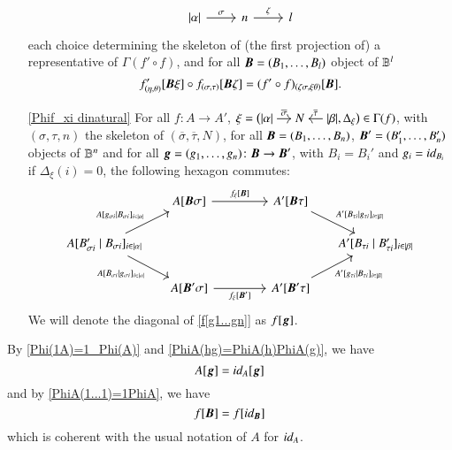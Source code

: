 \begin{definition}
\begin{itemize}[wide=0pt,leftmargin=*]
\[\begin{tikzcd}
        \length\alpha \ar[r,"\sigma"] & n \ar[r,"\zeta"] & l
        \end{tikzcd}
        \]
        each choice determining the skeleton of (the first projection of) a representative of $\Gamma(f' \circ f)$, and for all ${\boldsymbol B}=(B_1,\dots,B_l)$ object of $\mathbb B^l$
        \[
        f'_{(\eta,\theta)}[{\boldsymbol B}\xi] \circ f_{(\sigma,\tau)}[{\boldsymbol B}\zeta] = (f'\circ f)_{(\zeta\sigma,\xi\theta)}[{\boldsymbol B}].
        \] 
        \item[\ref{Phif_xi dinatural}] For all $f \colon A \to A'$, $\xi= \bigl(
        \begin{tikzcd}[cramped,sep=small]
        \length\alpha \ar[r,"\overline\sigma"] & N & \length\beta \ar[l,"\overline\tau"']
        \end{tikzcd}, \Delta_\xi \bigr) \in \Gamma(f)
        $,
        with
        $(\sigma,\tau,n)$ the skeleton of $(\overline\sigma,\overline\tau,N)$, for all ${\boldsymbol B}=(B_1,\dots,B_n)$, ${\boldsymbol B}'=(B_1',\dots,B_n')$ objects of $\mathbb B^n$ and for all ${\boldsymbol g}=(g_1,\dots,g_n) \colon {\boldsymbol B} \to {\boldsymbol B}'$, with $B_i=B_i'$ and  $g_i=\mathop{\textit{id}_{B_i}}$ if $\Delta_\xi(i)=0$, the following hexagon commutes:
        \begin{equation}\label{f[g1...gn]}
        \begin{tikzcd}[column sep={0.5cm}]
        & A[\bfB\sigma] \ar[rrr,"{f_\xi [\bfB]}"] 
        & &&  A' [\bfB\tau] \ar[dr,"\funminplussq{A'}{B_{\tau i}}{g_{\tau i}} i {\length\beta}"] \\
        \funminplussq{A}{B_{\sigma i}'}{B_{\sigma i}} i {\length\alpha} \ar[ur,"{\funminplussq{A}{g_{\sigma i}}{B_{\sigma i}} i {\length\alpha}}"]
        \ar[dr,"\funminplussq{A} {{B_{\sigma i}}} {{g_{\sigma i}}} i {\length\alpha}"'] & & && 
        & \funminplussq { A'} {B_{\tau i}}{B_{\tau i}'} i {\length\beta} \\
        & A [\bfB'\sigma] 
        \ar[rrr,"{f_\xi [\bfB']}"']
        & & & A'[\bfB'\tau] 
        \ar[ur,"\funminplussq{A'}{g_{\tau i}}{B_{\tau i}} i {\length\beta}"']
        \end{tikzcd}
        \end{equation}
        We will denote the diagonal of \ref{f[g1...gn]} as $f[{\boldsymbol g}]$. 
    \end{itemize}
\end{definition}

\begin{remark}
    By \ref{Phi(1A)=1_Phi(A)} and \ref{PhiA(hg)=PhiA(h)PhiA(g)}, we have
    \[
    A[{\boldsymbol g}] = \mathop{\textit{id}_{A}} [{\boldsymbol g}]
    \]
    and by \ref{PhiA(1...1)=1PhiA}, we have
    \[
    f[{\boldsymbol B}] = f[\mathop{\textit{id}_{{\boldsymbol B}}}]
    \]
    which is coherent with the usual notation of $A$ for $\mathop{\textit{id}_{A}}$.
\end{remark}

